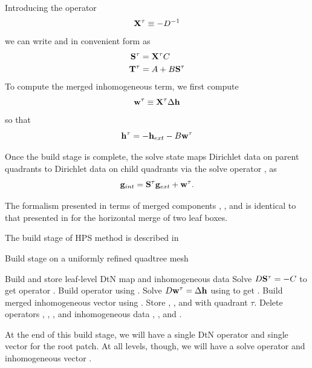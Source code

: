 Introducing  the operator
\begin{equation}
\mathbf X^{\tau} \equiv -D^{-1}
\label{eq:xtau}
\end{equation}
we can write \Ttau and  \Stau in convenient form as
\begin{equation}
\begin{aligned}
\mathbf S^{\tau} & = \mathbf X^{\tau} C \\
\mathbf T^{\tau} & = A + B\mathbf S^{\tau} \\
\label{eq:stau_ttau}
\end{aligned}
\end{equation}
To compute the merged inhomogeneous term, we first compute
\begin{equation}
\mathbf w^{\tau} \equiv \mathbf X^{\tau}\Delta \mathbf h
\label{eq:wtau-merged}
\end{equation}
so that
\begin{equation}
\mathbf h^{\tau} = -\mathbf h_{ext} - B\mathbf w^{\tau}
\label{eq:htau}
\end{equation}

Once the build stage is complete, the solve state maps Dirichlet data on parent quadrants to Dirichlet data on child quadrants via the solve operator \Stau, as
\begin{equation}
\mathbf g_{int} = \mathbf S^{\tau} \mathbf g_{ext} + \mathbf w^{\tau}.
\label{eq:solve_eqn}
\end{equation}

The formalism presented in terms of merged components \Xtau, \Stau, \Ttau and \htau is identical to that presented in \citep{martinsson2015hierarchical} for the horizontal merge of two leaf boxes.

The build stage of HPS method is described in 
\begin{algorithm}[H]
    \caption{Build stage on a uniformly refined quadtree mesh}
    \begin{algorithmic}[0]
         
                \State Build and store leaf-level DtN map \Ttau and inhomogeneous data \htau
            \Else {}
                \State Solve $D\mathbf S^{\tau} = -C$ to get operator \Stau. 
                \State Build operator \Ttau using .      
                \State Solve $D\mathbf w^{\tau} = \Delta \mathbf h$ using to get \wtau.  
                \State Build merged inhomogeneous vector \htau using .
                \State Store \Stau, \Ttau, \htau and \wtau with quadrant $\tau$.
                \State Delete operators \Talpha, \Tbeta, \Tgamma, \Tomega and inhomogeneous data \halpha, \hbeta, \hgamma and \homega.
            \EndIf
        \EndFor
    \end{algorithmic}
    \label{alg:build_merge_uniform}
\end{algorithm}
At the end of this build stage, we will have a single DtN operator \Ttau and single vector \htau for the root patch.  At all levels, though, we will have a solve operator \Stau and inhomogeneous vector \wtau.

